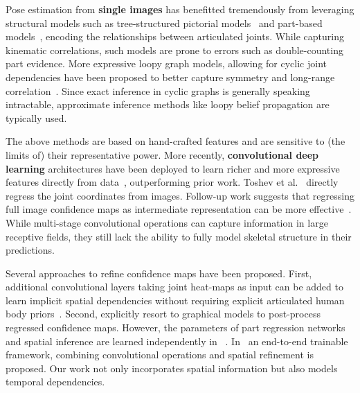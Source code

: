 \documentclass[10pt,twocolumn,letterpaper]{article}
\newcommand{\note}[3]{{\color{#2}[#1: #3]}}
\newcommand{\OH}[1]{\note{O}{red}{#1}}
\begin{document}

Pose estimation from \textbf{single images} has benefitted tremendously from leveraging structural models such as tree-structured pictorial models~\cite{andriluka2009pictorial} and part-based models~\cite{johnson2010clustered,pishchulin2013poselet,ramanan2006learning,yang2011articulated}, encoding the relationships between articulated joints. While capturing kinematic correlations, such models are prone to errors such as double-counting part evidence.
More expressive loopy graph models, allowing for cyclic joint dependencies have been proposed to better capture symmetry and long-range correlation~\cite{dantone2013human,ren2005recovering,sigal2006measure,sun2011articulated}. Since exact inference in cyclic graphs is generally speaking intractable, approximate inference methods like loopy belief propagation are typically used. %

The above methods are based on hand-crafted features and are sensitive to (the limits of) their representative power. More recently, \textbf{convolutional deep learning} architectures have been deployed to learn richer and more expressive features directly from data~\cite{chen2014articulated,ouyang2014multi,tompson2014joint,pishchulin2015deepcut,toshev2014deeppose}, outperforming prior work. Toshev et al.~\cite{toshev2014deeppose} directly regress the joint coordinates from images. Follow-up work suggests that regressing full image confidence maps as intermediate representation can be more effective~\cite{tompson2014joint,chen2014articulated}. While multi-stage convolutional operations can capture information in large receptive fields, they still lack the ability to fully model skeletal structure in their predictions.

Several approaches to refine confidence maps have been proposed.
%
First, additional convolutional layers taking joint heat-maps as input can be added to learn implicit spatial dependencies without requiring explicit articulated human body priors~\cite{tompson2014joint,wei2016cpm,chu2016structure}.
Second, \cite{pishchulin2015deepcut,chen2014articulated} explicitly resort to graphical models to post-process regressed confidence maps.
%
However, the parameters of part regression networks and spatial inference are learned independently in ~\cite{chen2014articulated,pishchulin2015deepcut}. In~\cite{yang2016end} an end-to-end trainable framework, combining convolutional operations and spatial refinement is proposed. Our work not only incorporates spatial information but also models temporal dependencies.
\end{document}
